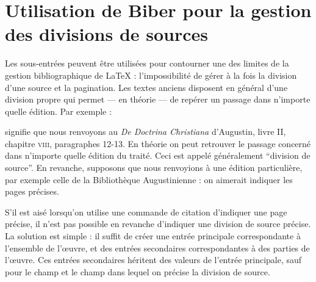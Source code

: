 \section[Division des sources antiques]{Utilisation de Biber pour la gestion des divisions de sources}\label{divisionsource}

Les sous-entrées peuvent être utilisées pour contourner une des limites de la gestion bibliographique de \LaTeX{} : l'impossibilité de gérer à la fois  la division d'une source et la pagination. Les textes anciens disposent en général d'une division propre qui permet --- en théorie ---  de repérer un passage dans n'importe quelle édition. Par exemple :

\begin{quotation}
\cite{DoctrineChretienneDivision}
\end{quotation}

signifie que nous renvoyons au \emph{De Doctrina Christiana} d'Augustin, livre II, chapitre \textsc{viii}, paragraphes 12-13. En théorie on peut retrouver le passage concerné dans n'importe quelle édition du traité. Ceci est appelé généralement \enquote{division de source}.
En revanche, supposons que nous renvoyions à une édition particulière, par exemple celle de la Bibliothèque Augustinienne : on aimerait indiquer les pages précises.

\begin{quotation}
\cite{DeDoctChrIIviii18-20}
\end{quotation}

S'il est aisé lorsqu'on utilise une commande de citation d'indiquer une page précise, il n'est pas possible en revanche d'indiquer une division de source précise. La solution est  simple : il suffit de créer une entrée principale correspondante à l'ensemble de l'œuvre, et des entrées secondaires correspondantes à des parties de l'œuvre. Ces entrées secondaires héritent des valeurs de l'entrée principale, sauf pour le champ  et le champ  dans lequel on précise la division de source.

